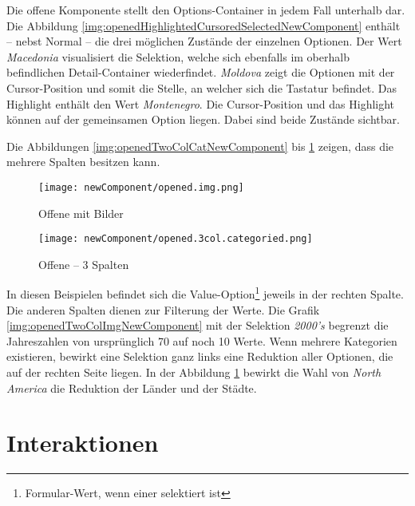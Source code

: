 Die offene Komponente stellt den Options-Container in jedem Fall unterhalb dar. 
Die Abbildung \ref{img:openedHighlightedCursoredSelectedNewComponent} enthält – nebst Normal – die drei möglichen Zustände der einzelnen Optionen. 
Der Wert \emph{Macedonia} visualisiert die Selektion, welche sich ebenfalls im oberhalb befindlichen Detail-Container wiederfindet. 
\emph{Moldova} zeigt die Optionen mit der Cursor-Position und somit die Stelle, an welcher sich die Tastatur befindet. 
Das Highlight enthält den Wert \emph{Montenegro}. 
Die Cursor-Position und das Highlight können auf der gemeinsamen Option liegen. 
Dabei sind beide Zustände sichtbar. 

Die Abbildungen \ref{img:openedTwoColCatNewComponent} bis \ref{img:openedThreeColCatNewComponent} zeigen, dass die  mehrere Spalten besitzen kann. 

\begin{figure}[!htb]
    \begin{minipage}[b]{0.43\textwidth}
        \centering
        \texttt{[image: newComponent/opened.img.png]}
        \caption{\centering Offene  mit Bilder}
        \label{img:openedTwoColImgNewComponent}
    \end{minipage}
    \hfill
    \begin{minipage}[b]{0.47\textwidth}
        \centering
        \texttt{[image: newComponent/opened.3col.categoried.png]}
        \caption{\centering Offene  – 3 Spalten}
        \label{img:openedThreeColCatNewComponent}
    \end{minipage}
\end{figure}

In diesen Beispielen befindet sich die Value-Option\footnote{
    Formular-Wert, wenn einer selektiert ist
} jeweils in der rechten Spalte. 
Die anderen Spalten dienen zur Filterung der Werte. 
Die Grafik \ref{img:openedTwoColImgNewComponent} mit der Selektion \emph{2000's} begrenzt die Jahreszahlen von ursprünglich 70 auf noch 10 Werte. 
Wenn mehrere Kategorien existieren, bewirkt eine Selektion ganz links eine Reduktion aller Optionen, die auf der rechten Seite liegen. 
In der Abbildung \ref{img:openedThreeColCatNewComponent} bewirkt die Wahl von \emph{North America} die Reduktion der Länder und der Städte. 


\section{Interaktionen} %
\label{sec:interaction}

